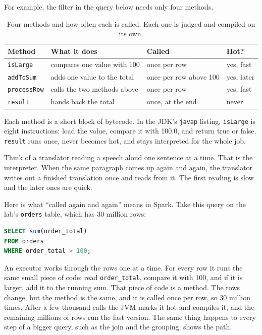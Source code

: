 For example, the filter in the query below needs only four methods.

\begin{table}[H]
\centering\footnotesize
\renewcommand{\arraystretch}{1.2}
\begin{tabular}{@{}P{3.2cm}P{5.4cm}P{3.4cm}P{2.2cm}@{}}
\toprule
\textbf{Method} & \textbf{What it does} & \textbf{Called} & \textbf{Hot?} \\
\midrule
\texttt{isLarge} & compares one value with 100 & once per row & yes, fast \\
\texttt{addToSum} & adds one value to the total & once per row above 100 & yes, later \\
\texttt{processRow} & calls the two methods above & once per row & yes, fast \\
\texttt{result} & hands back the total & once, at the end & never \\
\bottomrule
\end{tabular}
\caption{Four methods and how often each is called. Each one is judged and
compiled on its own.}
\label{tab:mem-methods}
\end{table}

Each method is a short block of bytecode. In the JDK's \texttt{javap} listing,
\texttt{isLarge} is eight instructions: load the value, compare it with 100.0, and
return true or false. \texttt{result} runs once, never becomes hot, and stays
interpreted for the whole job.

Think of a translator reading a speech aloud one sentence at a time. That is the
interpreter. When the same paragraph comes up again and again, the translator writes
out a finished translation once and reads from it. The first reading is slow and the
later ones are quick.

Here is what ``called again and again'' means in Spark. Take this query on the
lab's \texttt{orders} table, which has 30 million rows:

\begin{lstlisting}[language=sql,numbers=none,caption={A query whose inner step runs once per row},captionpos=b,label=lst:mem-hot-method]
SELECT sum(order_total)
FROM orders
WHERE order_total > 100;
\end{lstlisting}

\noindent An executor works through the rows one at a time. For every row it runs
the same small piece of code: read \texttt{order\_total}, compare it with 100, and if
it is larger, add it to the running sum. That piece of code is a method. The rows
change, but the method is the same, and it is called once per row, so 30 million
times. After a few thousand calls the JVM marks it hot and compiles it, and the
remaining millions of rows run the fast version. The same thing happens to every
step of a bigger query, such as the join and the grouping.
 shows the path.

